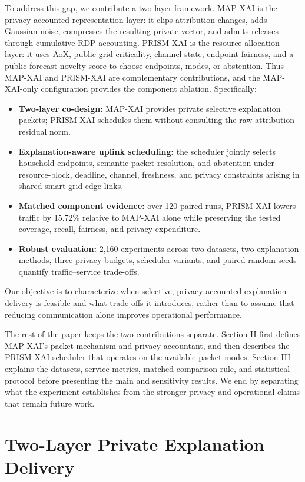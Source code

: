 \documentclass[conference]{IEEEtran}
\newcommand{\method}{PRISM-XAI}
\newcommand{\mapxai}{MAP-XAI}
\begin{document}
To address this gap, we contribute a two-layer framework. \mapxai{} is the
privacy-accounted representation layer: it clips attribution changes, adds
Gaussian noise, compresses the resulting private vector, and admits releases
through cumulative RDP accounting. \method{} is the resource-allocation
layer: it uses AoX, public grid criticality, channel state, endpoint fairness,
and a public forecast-novelty score to choose endpoints, modes, or abstention.
Thus MAP-XAI and PRISM-XAI are complementary contributions, and the
MAP-XAI-only configuration provides the component ablation. Specifically:
\begin{itemize}[leftmargin=*,nosep]
    \item \textbf{Two-layer co-design:} MAP-XAI provides private selective
    explanation packets; PRISM-XAI schedules them without consulting the raw
    attribution-residual norm.
    \item \textbf{Explanation-aware uplink scheduling:} the scheduler jointly
    selects household endpoints, semantic packet resolution, and abstention
    under resource-block, deadline, channel, freshness, and privacy constraints
    arising in shared smart-grid edge links.
    \item \textbf{Matched component evidence:} over 120 paired runs,
    PRISM-XAI lowers traffic by 15.72\% relative to MAP-XAI alone while
    preserving the tested coverage, recall, fairness, and privacy expenditure.
    \item \textbf{Robust evaluation:} 2,160 experiments across two datasets,
    two explanation methods, three privacy budgets, scheduler variants, and
    paired random seeds quantify traffic--service trade-offs.
\end{itemize}
Our objective is to characterize when selective,
privacy-accounted explanation delivery is feasible
and what trade-offs it introduces, rather than
to assume that reducing communication alone
improves operational performance.

The rest of the paper keeps the two contributions separate. Section II first
defines MAP-XAI's packet mechanism and privacy accountant, and then describes
the PRISM-XAI scheduler that operates on the available packet modes. Section
III explains the datasets, service metrics, matched-comparison rule, and
statistical protocol before presenting the main and sensitivity results. We
end by separating what the experiment establishes from the stronger privacy
and operational claims that remain future work.

\section{Two-Layer Private Explanation Delivery}
\end{document}
